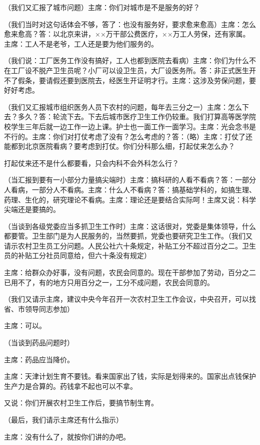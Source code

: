 （我们又汇报了城市问题）主席：你们对城市是不是服务的好？

（我们当时对这句话体会不够，答了：也没有服务好，要求愈来愈高）主席：怎么愈来愈高？答：以北京来讲，××万干部公费医疗，××万工人劳保，还有家属。主席：工人不是老爷，工人还是要为他们服务的。

（我们说：工厂医务工作没有搞好，工人也都到医院去看病）主席：你们为什么不在工厂设不脱产卫生员呢？小厂可以设卫生员，大厂设医务所。答：非正式医生开不了假条，要请假还要到医院去，经医生开证明才行。主席：这涉及劳保问题，要好好考虑。

（我们又汇报城市组织医务人员下农村的问题，每年去三分之一）主席：怎么下去？多久？答：轮流下去。下去后城市医疗卫生工作仍较重。我们打算高等医学院校学生三年后就一边工作一边上课。护士也一面工作一面学习。主席：光会念书是不行的。主席：你们对打仗考虑了没有？怎么考虑的？答：（略）主席：打仗了还能都到北京医院看病？要考虑到打仗。你们分科那么细，打起仗来怎么办？

打起仗来还不是什么都要看，只会内科不会外科怎么行？

（当汇报到要有一小部分力量搞尖端时）主席：搞科研的人看不看病？答：一部分人看病，一部分人不看病。主席：什么人不看病？答：搞基础学科的，如搞生理、药理、生化的，研究理论不看病。主席：理论还是要结合实际呵！主席又说：科学尖端还是要搞的。

（当谈到各级党委应当多抓卫生工作时）主席：这话很对，党委是集体领导，什么都要管。卫生部门是为人民服务的，当然要抓，党委也要研究卫生工作。（我们又请示农村卫生员工分问题。人民公社六十条规定，补贴工分不超过百分之二。卫生员的补贴工分社员同意给，但六十条没有规定）

主席：给群众办好事，没有问题，农民会同意的。现在干部参加了劳动，百分之二已用不了，有的地方只用百分之一，工分不成问题，农民会同意的。

（我们又请示主席，建议中央今年召开一次农村卫生工作会议，中央召开，可以找省、市领导同志参加）

主席：可以。

（当谈到药品问题时）

主席：药品应当降价。

主席：天津计划生育不要钱。看来国家出了钱，实际是划得来的。国家出点钱保护生产力是合算的。药钱拿不起也可以不拿。

又说：你们开展农村卫生工作后，要搞节制生育。

（最后，我们请示主席还有什么指示）

主席：没有什么了，就按你们讲的办吧。

